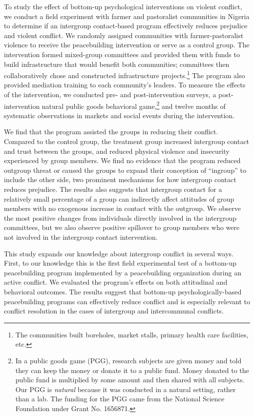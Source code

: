 \documentclass[11pt]{article}
\begin{document}
To study the effect of bottom-up psychological interventions on violent
conflict, we conduct a field experiment with farmer and pastoralist
communities in Nigeria to determine if an intergroup contact-based
program effectively reduces prejudice and violent conflict. We randomly
assigned communities with farmer-pastoralist violence to receive the
peacebuilding intervention or serve as a control group. The intervention
formed mixed-group committees and provided them with funds to build
infrastructure that would benefit both communities; committees then
collaboratively chose and constructed infrastructure projects.\footnote{The
  communities built boreholes, market stalls, primary health care
  facilities, etc.} The program also provided mediation training to each
community's leaders. To measure the effects of the intervention, we
conducted pre- and post-intervention surveys, a post-intervention
natural public goods behavioral game,\footnote{In a public goods game
  (PGG), research subjects are given money and told they can keep the
  money or donate it to a public fund. Money donated to the public fund
  is multiplied by some amount and then shared with all subjects. Our
  PGG is \emph{natural} because it was conducted in a natural setting,
  rather than a lab. The funding for the PGG came from the National
  Science Foundation under Grant No. 1656871.} and twelve months of
systematic observations in markets and social events during the
intervention.

We find that the program assisted the groups in reducing their conflict.
Compared to the control group, the treatment group increased intergroup
contact and trust between the groups, and reduced physical violence and
insecurity experienced by group members. We find no evidence that the
program reduced outgroup threat or caused the groups to expand their
conception of ``ingroup'' to include the other side, two prominent
mechanisms for how intergroup contact reduces prejudice. The results
also suggests that intergroup contact for a relatively small percentage
of a group can indirectly affect attitudes of group members with no
exogenous increase in contact with the outgroup. We observe the most
positive changes from individuals directly involved in the intergroup
committees, but we also observe positive spillover to group members who
were not involved in the intergroup contact intervention.

This study expands our knowledge about intergroup conflict in several
ways. First, to our knowledge this is the first field experimental test
of a bottom-up peacebuilding program implemented by a peacebuilding
organization during an active conflict. We evaluated the program's
effects on both attitudinal and behavioral outcomes. The results suggest
that bottom-up psychologically-based peacebuilding programs can
effectively reduce conflict and is especially relevant to conflict
resolution in the cases of intergroup and intercommunal conflicts.
\end{document}
